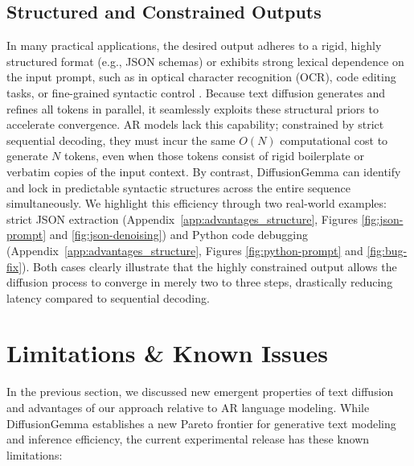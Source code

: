 \documentclass[11pt, a4paper, logo, copyright, gdm]{google}
\begin{document}
\subsection{Structured and Constrained Outputs}
In many practical applications, the desired output adheres to a rigid, highly structured format (e.g., JSON schemas) or exhibits strong lexical dependence on the input prompt, such as in optical character recognition (OCR), code editing tasks, or fine-grained syntactic control \citep{chen2023textdiffuser, li2022diffusionlm}. Because text diffusion generates and refines all tokens in parallel, it seamlessly exploits these structural priors to accelerate convergence. AR models lack this capability; constrained by strict sequential decoding, they must incur the same $O(N)$ computational cost to generate $N$ tokens, even when those tokens consist of rigid boilerplate or verbatim copies of the input context. By contrast, DiffusionGemma can identify and lock in predictable syntactic structures across the entire sequence simultaneously. We highlight this efficiency through two real-world examples: strict JSON extraction (Appendix~\ref{app:advantages_structure}, Figures \ref{fig:json-prompt} and \ref{fig:json-denoising}) and Python code debugging (Appendix~\ref{app:advantages_structure}, Figures \ref{fig:python-prompt} and \ref{fig:bug-fix}). Both cases clearly illustrate that the highly constrained output allows the diffusion process to converge in merely two to three steps, drastically reducing latency compared to sequential decoding.

\section{Limitations \& Known Issues} \label{sec:limitations}

In the previous section, we discussed new emergent properties of text diffusion and advantages of our approach relative to AR language modeling. While DiffusionGemma establishes a new Pareto frontier for generative text modeling and inference efficiency, the current experimental release has these known limitations:
\end{document}
